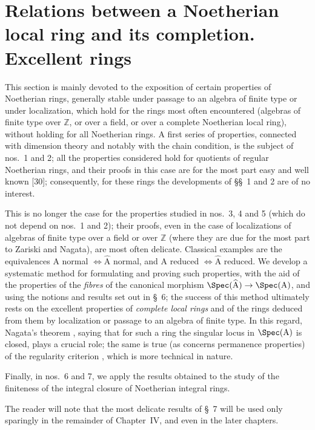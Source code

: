 \section{Relations between a Noetherian local ring and its completion. Excellent rings}
\label{section:IV.7}

This section is mainly devoted to the exposition of certain properties of
Noetherian rings, generally stable under passage to an algebra of finite type
or under localization, which hold for the rings most often encountered
(algebras of finite type over $\mathbb Z$, or over a field, or over a complete
Noetherian local ring), without holding for all Noetherian rings. A first
series of properties, connected with dimension theory and notably with the
chain condition, is the subject of nos.~1 and 2; all the properties considered
hold for quotients of regular Noetherian rings, and their proofs in this case
are for the most part easy and well known [30]; consequently, for these rings
the developments of \S\S~1 and 2 are of no interest.

This is no longer the case for the properties studied in nos.~3, 4 and 5
(which do not depend on nos.~1 and 2); their proofs, even in the case of
localizations of algebras of finite type over a field or over $\mathbb Z$
(where they are due for the most part to Zariski and Nagata), are most often
delicate. Classical examples are the equivalences
$\mathrm{A}$ normal $\Longleftrightarrow\widehat{\mathrm{A}}$ normal, and
$\mathrm{A}$ reduced $\Longleftrightarrow\widehat{\mathrm{A}}$ reduced. We
develop a systematic method for formulating and proving such properties, with
the aid of the properties of the \emph{fibres} of the canonical morphism
$\Spec(\widehat{\mathrm{A}})\to\Spec(\mathrm{A})$, and using the notions and
results set out in \S~6; the success of this method ultimately rests on the
excellent properties of \emph{complete local rings} and of the rings deduced
from them by localization or passage to an algebra of finite type. In this
regard, Nagata's theorem , saying that for such a ring the
singular locus in $\Spec(\mathrm{A})$ is closed, plays a crucial role; the same
is true (as concerns permanence properties) of the regularity criterion
, which is more technical in nature.

Finally, in nos.~6 and 7, we apply the results obtained to the study of the
finiteness of the integral closure of Noetherian integral rings.

The reader will note that the most delicate results of \S~7 will be used only
sparingly in the remainder of Chapter~IV, and even in the later chapters.


